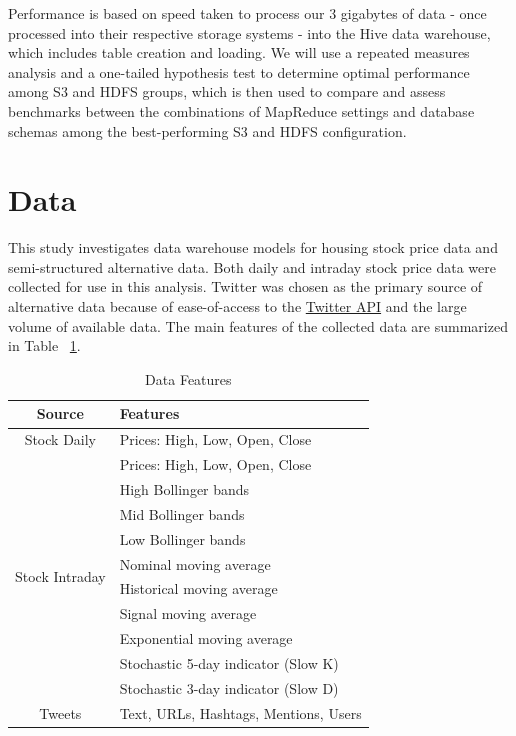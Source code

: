 \documentclass[journal]{IEEEtran}
\begin{document}
Performance is based on speed taken to process our 3 gigabytes of data 
 - once processed into their respective storage systems - 
 into the Hive data warehouse, which includes table creation and loading. 
We will use a repeated measures analysis and a one-tailed hypothesis 
 test to determine optimal performance among S3 and HDFS groups, 
 which is then used to compare and assess benchmarks between the 
 combinations of MapReduce settings and database schemas among the
 best-performing S3 and HDFS configuration.

\section{Data}

This study investigates data warehouse models for housing stock
 price data and semi-structured alternative data. 
Both daily and intraday stock price data were collected
 for use in this analysis. 
Twitter was chosen as the primary source of alternative data because of
 ease-of-access to the \href{https://developer.twitter.com/en/docs}{Twitter API} 
 and the large volume of available data.
The main features of the collected data are summarized in Table ~\ref{DataFeatures}.

\begin{table}
	\renewcommand{\arraystretch}{1.3}
	\caption{Data Features}
	\label{DataFeatures}
	\centering
	\begin{tabular}{c|l}
		\hline
		Source       & Features\\
		\hline
		\hline
		Stock Daily  & Prices: High, Low, Open, Close\\
		\hline
		\multirow{10}{*}{Stock Intraday} &  Prices: High, Low, Open, Close \\
		&  High Bollinger bands\\
		&  Mid Bollinger bands\\
		&  Low Bollinger bands\\ 
		&  Nominal moving average\\
		&  Historical moving average\\
		&  Signal moving average\\ 
		&  Exponential moving average\\
		&  Stochastic 5-day indicator (Slow K)\\
		&  Stochastic 3-day indicator (Slow D)\\
		\hline
		Tweets       & Text, URLs, Hashtags, Mentions, Users\\
		\hline
	\end{tabular}
\end{table}
\end{document}
